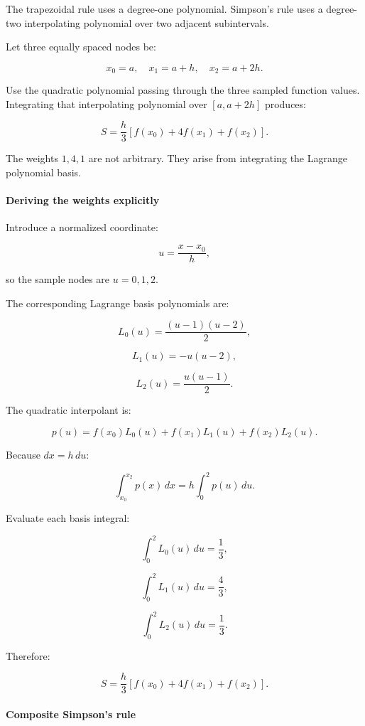 \hypertarget{02-foundations-ii-ch022-simpsons-rule-integrating-a-local-quadratic-approximation}{}

The trapezoidal rule uses a degree-one polynomial. Simpson's rule uses a degree-two interpolating polynomial over two adjacent subintervals.

Let three equally spaced nodes be:

\[
x_0=a,\quad x_1=a+h,\quad x_2=a+2h.
\]

Use the quadratic polynomial passing through the three sampled function values. Integrating that interpolating polynomial over \([a,a+2h]\) produces:

\[
\boxed{ S=\frac h3[f(x_0)+4f(x_1)+f(x_2)] }.
\]

The weights \(1,4,1\) are not arbitrary. They arise from integrating the Lagrange polynomial basis.

\paragraph{Deriving the weights explicitly}\label{02-foundations-ii-ch022-deriving-the-weights-explicitly}

\hypertarget{02-foundations-ii-ch022-deriving-the-weights-explicitly}{}

Introduce a normalized coordinate:

\[
u=\frac{x-x_0}{h},
\]

so the sample nodes are \(u=0,1,2\).

The corresponding Lagrange basis polynomials are:

\[
L_0(u)=\frac{(u-1)(u-2)}2,
\]

\[
L_1(u)=-u(u-2),
\]

\[
L_2(u)=\frac{u(u-1)}2.
\]

The quadratic interpolant is:

\[
p(u)=f(x_0)L_0(u)+f(x_1)L_1(u)+f(x_2)L_2(u).
\]

Because \(dx=h\,du\):

\[
\int_{x_0}^{x_2}p(x)\,dx = h\int_0^2p(u)\,du.
\]

Evaluate each basis integral:

\[
\int_0^2L_0(u)\,du=\frac13,
\]

\[
\int_0^2L_1(u)\,du=\frac43,
\]

\[
\int_0^2L_2(u)\,du=\frac13.
\]

Therefore:

\[
S=\frac h3[f(x_0)+4f(x_1)+f(x_2)].
\]

\paragraph{Composite Simpson's rule}\label{02-foundations-ii-ch022-composite-simpsons-rule}

